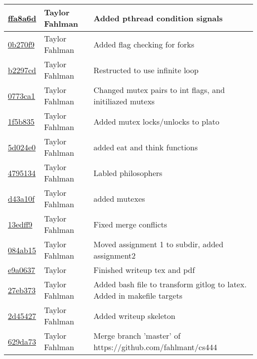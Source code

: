 \begin{tabular}{l l l}
\href{git@github.com:fahlmant/cs444/commit/ffa8a6dcce81ffcaa6b0953ac7e66c13a5eebf23}{ffa8a6d} & Taylor Fahlman & Added pthread condition signals\\\hline
\href{git@github.com:fahlmant/cs444/commit/0b270f9d732ab6a652aaba7f6947f13c0e9cdc46}{0b270f9} & Taylor Fahlman & Added flag checking for forks\\\hline
\href{git@github.com:fahlmant/cs444/commit/b2297cd2ec70c735e39a1cc26d5ff39478f011bf}{b2297cd} & Taylor Fahlman & Restructed to use infinite loop\\\hline
\href{git@github.com:fahlmant/cs444/commit/0773ca18437eb1aff2874e73ff18fe67681602dc}{0773ca1} & Taylor Fahlman & Changed mutex pairs to int flags, and initiliazed mutexs\\\hline
\href{git@github.com:fahlmant/cs444/commit/1f5b835fc8b41d44ee33a2f2e6f5ec916591957a}{1f5b835} & Taylor Fahlman & Added mutex locks/unlocks to plato\\\hline
\href{git@github.com:fahlmant/cs444/commit/5d024e0d8a49d0db3b239929402e049376df57e1}{5d024e0} & Taylor Fahlman & added eat and think functions\\\hline
\href{git@github.com:fahlmant/cs444/commit/4795134ae4187793f395617ba52841d7c9e7f6d1}{4795134} & Taylor Fahlman & Labled philosophers\\\hline
\href{git@github.com:fahlmant/cs444/commit/d43a10f1ac0ff2b53122ca42969b95d5e5b474b9}{d43a10f} & Taylor Fahlman & added mutexes\\\hline
\href{git@github.com:fahlmant/cs444/commit/13edff973f75105ee082af2453bb0ea1789c6823}{13edff9} & Taylor Fahlman & Fixed merge conflicts\\\hline
\href{git@github.com:fahlmant/cs444/commit/084ab1563492ad141bbbf835df613426e6070df2}{084ab15} & Taylor Fahlman & Moved assignment 1 to subdir, added assignment2\\\hline
\href{git@github.com:fahlmant/cs444/commit/e9a06375c5e5ee5232d5a3a71fa1dd1ac336b7cc}{e9a0637} & Taylor & Finished writeup tex and pdf\\\hline
\href{git@github.com:fahlmant/cs444/commit/27eb37349447092eec979e1d09531408f38ac661}{27eb373} & Taylor Fahlman & Added bash file to transform gitlog to latex. Added in makefile targets\\\hline
\href{git@github.com:fahlmant/cs444/commit/2d454270c6b79091f4c1363da7185e3ffbcb2301}{2d45427} & Taylor Fahlman & Added writeup skeleton\\\hline
\href{git@github.com:fahlmant/cs444/commit/629da73d1a287be9db4919d9bc27c987acfb7128}{629da73} & Taylor Fahlman & Merge branch 'master' of https://github.com/fahlmant/cs444\\\hline

\end{tabular}
